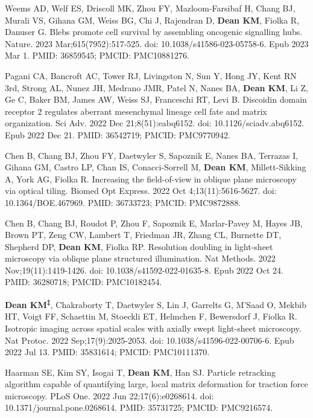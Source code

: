 \begin{etaremune}
\item Weems AD, Welf ES, Driscoll MK, Zhou FY, Mazloom-Farsibaf H, Chang BJ, Murali VS, Gihana GM, Weiss BG, Chi J, Rajendran D, \textbf{Dean KM}, Fiolka R, Danuser G. Blebs promote cell survival by assembling oncogenic signalling hubs. Nature. 2023 Mar;615(7952):517-525. doi: 10.1038/s41586-023-05758-6. Epub 2023 Mar 1. PMID: 36859545; PMCID: PMC10881276.

\item Pagani CA, Bancroft AC, Tower RJ, Livingston N, Sun Y, Hong JY, Kent RN 3rd, Strong AL, Nunez JH, Medrano JMR, Patel N, Nanes BA, \textbf{Dean KM}, Li Z, Ge C, Baker BM, James AW, Weiss SJ, Franceschi RT, Levi B. Discoidin domain receptor 2 regulates aberrant mesenchymal lineage cell fate and matrix organization. Sci Adv. 2022 Dec 21;8(51):eabq6152. doi: 10.1126/sciadv.abq6152. Epub 2022 Dec 21. PMID: 36542719; PMCID: PMC9770942.

\item Chen B, Chang BJ, Zhou FY, Daetwyler S, Sapoznik E, Nanes BA, Terrazas I, Gihana GM, Castro LP, Chan IS, Conacci-Sorrell M, \textbf{Dean KM}, Millett-Sikking A, York AG, Fiolka R. Increasing the field-of-view in oblique plane microscopy via optical tiling. Biomed Opt Express. 2022 Oct 4;13(11):5616-5627. doi: 10.1364/BOE.467969. PMID: 36733723; PMCID: PMC9872888.

\item Chen B, Chang BJ, Roudot P, Zhou F, Sapoznik E, Marlar-Pavey M, Hayes JB, Brown PT, Zeng CW, Lambert T, Friedman JR, Zhang CL, Burnette DT, Shepherd DP, \textbf{Dean KM}, Fiolka RP. Resolution doubling in light-sheet microscopy via oblique plane structured illumination. Nat Methods. 2022 Nov;19(11):1419-1426. doi: 10.1038/s41592-022-01635-8. Epub 2022 Oct 24. PMID: 36280718; PMCID: PMC10182454.

\item \textbf{Dean KM\textsuperscript{‡}}, Chakraborty T, Daetwyler S, Lin J, Garrelts G, M'Saad O, Mekbib HT, Voigt FF, Schaettin M, Stoeckli ET, Helmchen F, Bewersdorf J, Fiolka R. Isotropic imaging across spatial scales with axially swept light-sheet microscopy. Nat Protoc. 2022 Sep;17(9):2025-2053. doi: 10.1038/s41596-022-00706-6. Epub 2022 Jul 13. PMID: 35831614; PMCID: PMC10111370.

\item Haarman SE, Kim SY, Isogai T, \textbf{Dean KM}, Han SJ. Particle retracking algorithm capable of quantifying large, local matrix deformation for traction force microscopy. PLoS One. 2022 Jun 22;17(6):e0268614. doi: 10.1371/journal.pone.0268614. PMID: 35731725; PMCID: PMC9216574.


\end{etaremune}
